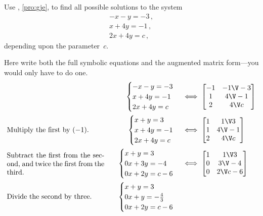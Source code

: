 \begin{example} \label{eg:gjea}
Use , \cref{pro:gje}, to find all possible solutions to the system
\begin{equation*}
\begin{array}{l}
-x-y=-3\,,\\x+4y=-1\,,\\2x+4y=c\,,
\end{array}
\end{equation*}
depending upon the parameter~\(c\).

\begin{solution} 
Here write both the full symbolic equations and the augmented matrix form---you would only have to do one.
\begin{align*}&&
\begin{cases}
-x-y=-3\\x+4y=-1\\2x+4y=c
\end{cases}
&\iff
\begin{bmatrix} -1&-1\V-3\\1&4\V-1\\2&4\V c \end{bmatrix}
\\&
\parbox{0.4\linewidth}{Multiply the first by~\((-1)\).}
\quad&
\begin{cases}
x+y=3\\x+4y=-1\\2x+4y=c
\end{cases}
&\iff
\begin{bmatrix} 1&1\V3\\1&4\V-1\\2&4\V c \end{bmatrix}
\\&
\parbox{0.4\linewidth}{Subtract the first from the second, and twice the first from the third.}
\quad&
\begin{cases}
x+y=3\\0x+3y=-4\\0x+2y=c-6
\end{cases}
&\iff
\begin{bmatrix} 1&1\V3\\0&3\V-4\\0&2\V c-6 \end{bmatrix}
\\&
\parbox{0.4\linewidth}{Divide the second by three.}
\quad&
\begin{cases}
x+y=3\\0x+y=-\frac43\\0x+2y=c-6

\end{cases}
\end{align*}
\end{solution}
\end{example}
